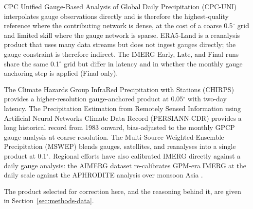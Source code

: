 CPC Unified Gauge-Based Analysis of Global Daily Precipitation
(CPC-UNI) \citep{ref:chen2008} interpolates gauge
observations directly and is therefore the highest-quality
reference where the contributing network is dense, at the cost
of a coarse 0.5$^{\circ}$ grid and limited skill where the
gauge network is sparse. ERA5-Land \citep{ref:munoz2021era5land}
is a reanalysis product that uses many data streams but does
not ingest gauges directly; the gauge constraint is therefore
indirect. The IMERG Early, Late, and Final runs share the same
0.1$^{\circ}$ grid but differ in latency and in whether the
monthly gauge anchoring step is applied (Final only).

The Climate Hazards
Group InfraRed Precipitation with Stations (CHIRPS)
\citep{ref:funk2015} provides a higher-resolution gauge-anchored
product at 0.05$^{\circ}$ with two-day latency. The Precipitation
Estimation from Remotely Sensed Information using Artificial Neural
Networks Climate Data Record (PERSIANN-CDR)
\citep{ref:ashouri2015} provides a long historical record from
1983 onward, bias-adjusted to the monthly GPCP gauge analysis at
coarse resolution. The Multi-Source Weighted-Ensemble
Precipitation (MSWEP) \citep{ref:beck2019}
blends gauges, satellites, and reanalyses into a single product
at 0.1$^{\circ}$. Regional efforts have also calibrated IMERG
directly against a daily gauge analysis: the AIMERG dataset
re-calibrates GPM-era IMERG at the daily scale against the
APHRODITE analysis over monsoon Asia \citep{ref:ma2020}.

The product selected for correction here, and the reasoning behind
it, are given in Section~\ref{sec:methods-data}.

